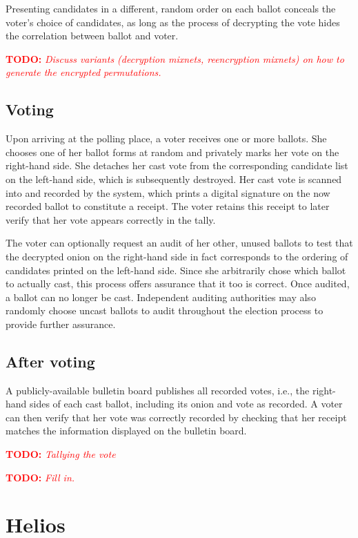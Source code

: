 \documentclass[10pt,twocolumn]{article}
\newcommand{\todo}[1]{\textcolor{red}{\textbf{TODO:} \emph{#1}}}
\begin{document}
Presenting candidates in a different, random order on each ballot conceals the voter's choice of candidates, as long as the process of decrypting the vote hides the correlation between ballot and voter.

\todo{Discuss variants (decryption mixnets, reencryption mixnets) on how to generate the encrypted permutations.}

\subsection{Voting}

Upon arriving at the polling place, a voter receives one or more ballots.
She chooses one of her ballot forms at random and privately marks her vote on the right-hand side.
She detaches her cast vote from the corresponding candidate list on the left-hand side, which is subsequently destroyed.
Her cast vote is scanned into and recorded by the system, which prints a digital signature on the now recorded ballot to constitute a receipt.
The voter retains this receipt to later verify that her vote appears correctly in the tally.

The voter can optionally request an audit of her other, unused ballots to test that the decrypted onion on the right-hand side in fact corresponds to the ordering of candidates printed on the left-hand side.
Since she arbitrarily chose which ballot to actually cast, this process offers assurance that it too is correct.
Once audited, a ballot can no longer be cast.
Independent auditing authorities may also randomly choose uncast ballots to audit throughout the election process to provide further assurance.

\subsection{After voting}
A publicly-available bulletin board publishes all recorded votes, i.e., the right-hand sides of each cast ballot, including its onion and vote as recorded.
A voter can then verify that her vote was correctly recorded by checking that her receipt matches the information displayed on the bulletin board.

\todo{Tallying the vote}

\todo{Fill in.}

\section{Helios}
\end{document}
